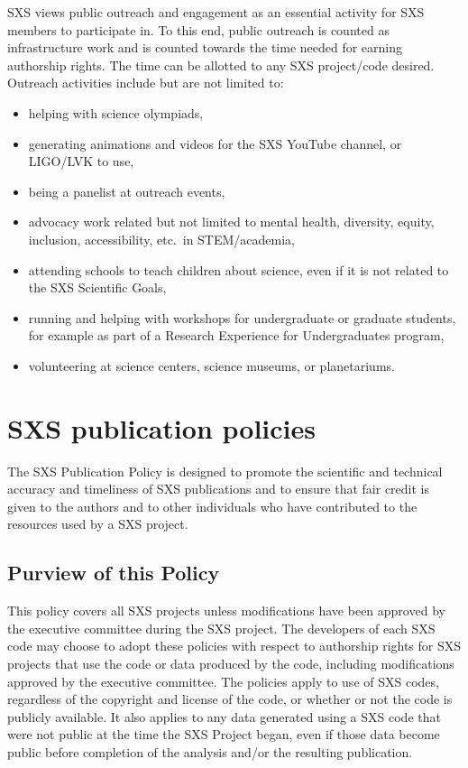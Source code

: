 \documentclass[12pt]{article}
\begin{document}
SXS views public outreach and engagement as an essential activity for
SXS members to participate in. To this end, public outreach is counted
as infrastructure work and is counted towards the time needed for
earning authorship rights. The time can be allotted to any SXS
project/code desired. Outreach activities include but are not limited
to:
\begin{itemize}
\setlength\itemsep{-0.25em}
\item helping with science olympiads,
\item generating animations and videos for the SXS YouTube channel, or LIGO/LVK
  to use,
\item being a panelist at outreach events,
\item advocacy work related but not limited to mental health, diversity, equity,
  inclusion, accessibility, etc.~in STEM/academia,
\item attending schools to teach children about science, even if it is not
  related to the SXS Scientific Goals,
\item running and helping with workshops for undergraduate or graduate students,
  for example as part of a Research Experience for Undergraduates program,
\item volunteering at science centers, science museums, or planetariums.
\end{itemize}

\section{SXS publication policies}\label{sec:publication_policies}

The SXS Publication Policy is designed to promote the scientific and
technical accuracy and timeliness of SXS publications and to ensure
that fair credit is given to the authors and to other individuals who
have contributed to the resources used by a SXS project.

\subsection{Purview of this Policy}

This policy covers all SXS projects unless modifications have been
approved by the executive committee during the SXS project.  The
developers of each SXS code may choose to adopt these policies with
respect to authorship rights for SXS projects that use the code or
data produced by the code, including modifications approved by the
executive committee.  The policies apply to use of SXS codes,
regardless of the copyright and license of the code, or whether or not
the code is publicly available. It also applies to any data generated
using a SXS code that were not public at the time the SXS Project
began, even if those data become public before completion of the
analysis and/or the resulting publication.
\end{document}
